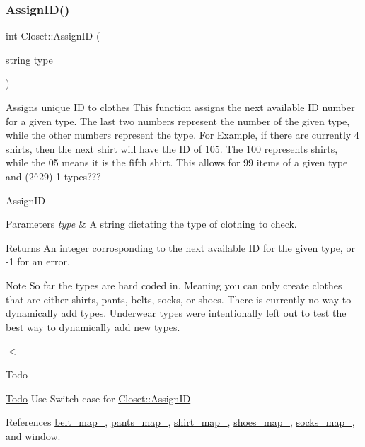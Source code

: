 \subsubsection{\texorpdfstring{Assign\+I\+D()}{AssignID()}}
{\footnotesize\ttfamily int Closet\+::\+Assign\+ID (\begin{DoxyParamCaption}\item[{string}]{type }\end{DoxyParamCaption})\hspace{0.3cm}{\ttfamily [private]}}



Assigns unique ID to clothes  This function assigns the next available ID number for a given type. The last two numbers represent the number of the given type, while the other numbers represent the type. For Example, if there are currently 4 shirts, then the next shirt will have the ID of 105. The 100 represents shirts, while the 05 means it is the fifth shirt. This allows for 99 items of a given type and (2$^\wedge$29)-\/1 types??? 

Assign\+ID 
\begin{DoxyParams}{Parameters}
{\em type} & A string dictating the type of clothing to check. \\
\hline
\end{DoxyParams}
\begin{DoxyReturn}{Returns}
An integer corrosponding to the next available ID for the given type, or -\/1 for an error. 
\end{DoxyReturn}
\begin{DoxyNote}{Note}
So far the types are hard coded in. Meaning you can only create clothes that are either shirts, pants, belts, socks, or shoes. There is currently no way to dynamically add types. Underwear types were intentionally left out to test the best way to dynamically add new types. 
\end{DoxyNote}
$<$\begin{DoxyRefDesc}{Todo}
\item[\mbox{\hyperlink{todo__todo000001}{Todo}}]Use Switch-\/case for \mbox{\hyperlink{classCloset_afabc27d621abdf0089a6b3027ea8f470}{Closet\+::\+Assign\+ID}} \end{DoxyRefDesc}


References \mbox{\hyperlink{classCloset_a0631fe46e3c955109a613e1cd1d2cb52}{belt\+\_\+map\+\_\+}}, \mbox{\hyperlink{classCloset_a8be78859dfab9e2aa09bfbbb8f191dab}{pants\+\_\+map\+\_\+}}, \mbox{\hyperlink{classCloset_a8126a023a2777b84b23436da8d1f4b35}{shirt\+\_\+map\+\_\+}}, \mbox{\hyperlink{classCloset_ab1e1ce9110a044c90244407f0f6f92c4}{shoes\+\_\+map\+\_\+}}, \mbox{\hyperlink{classCloset_a33a48dfc5ef542261bb0dd373f899f9e}{socks\+\_\+map\+\_\+}}, and \mbox{\hyperlink{classCloset_af1eb4f786cc4eccd3018b90632236a93}{window}}.

